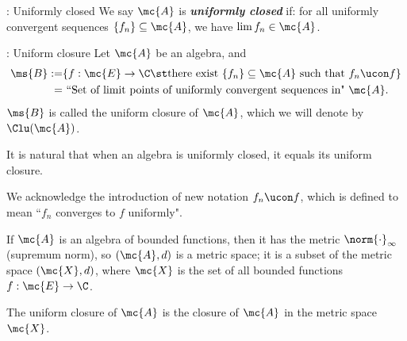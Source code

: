 \begin{ndef}{: Uniformly closed}
    We say \(\mc{A}\) is \emph{\textbf{uniformly closed}} if: for all uniformly convergent sequences \(\{f_n\}\subseteq\mc{A}\), we have \(\lim f_n\in\mc{A}\).
\end{ndef}

\begin{ndef}{: Uniform closure}
    Let \(\mc{A}\) be an algebra, and 
    \begin{align*} 
        \ms{B}:=&\{f:\mc{E}\to\C\st \text{there exist}~\{f_n\}\subseteq\mc{A}~\text{such that}~f_n\ucon f\}\\
               =&~\text{``Set of limit points of uniformly convergent sequences in"}~\mc{A}.
    \end{align*}
    \(\ms{B}\) is called the uniform closure of \(\mc{A}\), which we will denote by \(\Clu(\mc{A})\).
\end{ndef}
\begin{note}
    It is natural that when an algebra is uniformly closed, it equals its uniform closure.
\end{note}
\begin{notation}
    We acknowledge the introduction of new notation \(f_n\ucon f\), which is defined to mean ``\(f_n\) converges to \(f\) uniformly".
\end{notation}
\begin{note}
    If \(\mc{A}\) is an algebra of bounded functions, then it has the metric \(\norm{\cdot}_{\infty}\) (supremum norm), so \((\mc{A},d)\) is a metric space; it is a subset of the metric space \((\mc{X},d)\), where \(\mc{X}\) is the set of all bounded functions \(f:\mc{E}\to\C\).

    \medskip

    The uniform closure of \(\mc{A}\) is the closure of \(\mc{A}\) in the metric space \(\mc{X}\).
\end{note}

